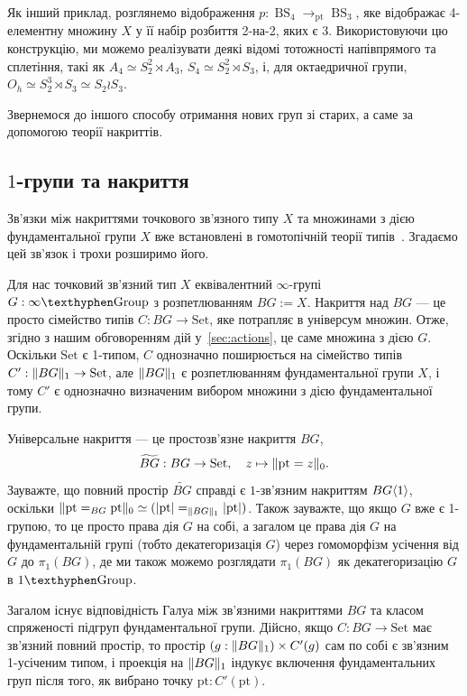 \documentclass[12pt]{article}
\newcommand*{\pt}{{\mathrm{pt}}}
\renewcommand*{\equiv}{\mathrel{\simeq}}
\DeclarePairedDelimiter\angled{\langle}{\rangle}
\DeclarePairedDelimiter\trunc{\lVert}{\rVert}
\DeclarePairedDelimiter\tr{\lvert}{\rvert}
\newcommand*\BS{\mathop{BS}}
\newcommand*{\Set}{\mathrm{Set}}
\newcommand*{\Grp}{\mathrm{\texthyphen Group}}
\begin{document}
Як інший приклад, розглянемо відображення $p : \BS_4 \to_\pt \BS_3$, яке відображає 4-елементну множину $X$ у її набір розбиття 2-на-2, яких є 3. Використовуючи цю конструкцію, ми можемо реалізувати деякі відомі тотожності напівпрямого та сплетіння, такі як $A_4 \equiv S_2^2 \rtimes A_3$, $S_4 \equiv S_2^2 \rtimes S_3$, і, для октаедричної групи, $O_h \equiv S_2^3 \rtimes S_3 \equiv S_2 \wr S_3$.

\smallskip

Звернемося до іншого способу отримання нових груп зі старих, а саме за допомогою теорії накриттів.

\subsection{\texorpdfstring{$1$}{1}-групи та накриття}
\label{sec:covering}

Зв'язки між накриттями точкового зв'язного типу $X$ та множинами з дією фундаментальної групи $X$ вже встановлені в гомотопічній теорії типів~\cite{FavoniaHarper2016}. Згадаємо цей зв'язок і трохи розширимо його.

Для нас точковий зв'язний тип $X$ еквівалентний $\infty$-групі $G : \infty\Grp$ з розпетлюванням $BG := X$. Накриття над $BG$ — це просто сімейство типів $C : BG \to \Set$, яке потрапляє в універсум множин. Отже, згідно з нашим обговоренням дій у~\autoref{sec:actions}, це саме множина з дією $G$. Оскільки $\Set$ є 1-типом, $C$ однозначно поширюється на сімейство типів $C' : \trunc{BG}_1 \to \Set$, але $\trunc{BG}_1$ є розпетлюванням фундаментальної групи $X$, і тому $C'$ є однозначно визначеним вибором множини з дією фундаментальної групи.

Універсальне накриття — це простозв'язне накриття $BG$,
\[
  \widetilde{BG} : BG \to \Set, \quad
  z \mapsto \trunc{\pt = z}_0.
\]
Зауважте, що повний простір $\widetilde{BG}$ справді є $1$-зв'язним накриттям $BG\angled1$, оскільки $\trunc{\pt =_{BG} \pt}_0 \equiv (\tr{\pt} =_{\trunc{BG}_1} \tr{\pt})$. Також зауважте, що якщо $G$ вже є 1-групою, то це просто права дія $G$ на собі, а загалом це права дія $G$ на фундаментальній групі (тобто декатегоризація $G$) через гомоморфізм усічення від $G$ до $\pi_1(BG)$, де ми також можемо розглядати $\pi_1(BG)$ як декатегоризацію $G$ в $1\Grp$.

Загалом існує відповідність Галуа між зв'язними накриттями $BG$ та класом спряженості підгруп фундаментальної групи. Дійсно, якщо $C : BG \to \Set$ має зв'язний повний простір, то простір $(g : \trunc{BG}_1) \times C'(g)$ сам по собі є зв'язним 1-усіченим типом, і проекція на $\trunc{BG}_1$ індукує включення фундаментальних груп після того, як вибрано точку $\pt : C'(\pt)$.
\end{document}
